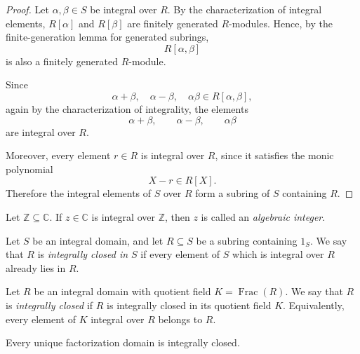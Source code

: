 \begin{proof}
    Let \(\alpha,\beta\in S\) be integral over \(R\). By the characterization of
    integral elements, \(R[\alpha]\) and \(R[\beta]\) are finitely generated
    \(R\)-modules. Hence, by the finite-generation lemma for generated subrings,
    \[
        R[\alpha,\beta]
    \]
    is also a finitely generated \(R\)-module.

    Since
    \[
        \alpha+\beta,\quad \alpha-\beta,\quad \alpha\beta
        \in R[\alpha,\beta],
    \]
    again by the characterization of integrality, the elements
    \[
        \alpha+\beta,\qquad \alpha-\beta,\qquad \alpha\beta
    \]
    are integral over \(R\).

    Moreover, every element \(r\in R\) is integral over \(R\), since it satisfies the
    monic polynomial
    \[
        X-r\in R[X].
    \]
    Therefore the integral elements of \(S\) over \(R\) form a subring of \(S\)
    containing \(R\).
\end{proof}

\begin{definition}
    Let \(\mathbb Z\subseteq \mathbb C\). If \(z\in\mathbb C\) is integral over
    \(\mathbb Z\), then \(z\) is called an \emph{algebraic integer}.
\end{definition}

\begin{definition}
    Let \(S\) be an integral domain, and let \(R\subseteq S\) be a subring containing
    \(1_S\). We say that \(R\) is \emph{integrally closed in \(S\)} if every element
    of \(S\) which is integral over \(R\) already lies in \(R\).
\end{definition}

\begin{definition}
    Let \(R\) be an integral domain with quotient field \(K=\operatorname{Frac}(R)\).
    We say that \(R\) is \emph{integrally closed} if \(R\) is integrally closed in
    its quotient field \(K\). Equivalently, every element of \(K\) integral over
    \(R\) belongs to \(R\).
\end{definition}

\begin{theorem}
    Every unique factorization domain is integrally closed.
\end{theorem}

